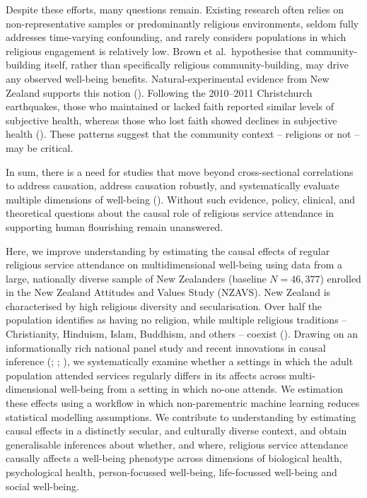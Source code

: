 \documentclass[
  single column]{article}
\begin{document}
Despite these efforts, many questions remain. Existing research often
relies on non-representative samples or predominantly religious
environments, seldom fully addresses time-varying confounding, and
rarely considers populations in which religious engagement is relatively
low. Brown et al.~hypothesise that community-building itself, rather
than specifically religious community-building, may drive any observed
well-being benefits. Natural-experimental evidence from New Zealand
supports this notion (). Following the 2010--2011 Christchurch earthquakes, those
who maintained or lacked faith reported similar levels of subjective
health, whereas those who lost faith showed declines in subjective
health (). These
patterns suggest that the community context -- religious or not -- may
be critical.

In sum, there is a need for studies that move beyond cross-sectional
correlations to address causation, address causation robustly, and
systematically evaluate multiple dimensions of well-being
().
Without such evidence, policy, clinical, and theoretical questions about
the causal role of religious service attendance in supporting human
flourishing remain unanswered.

Here, we improve understanding by estimating the causal effects of
regular religious service attendance on multidimensional well-being
using data from a large, nationally diverse sample of New Zealanders
(baseline \(N=46,377\)) enrolled in the New Zealand Attitudes and Values
Study (NZAVS). New Zealand is characterised by high religious diversity
and secularisation. Over half the population identifies as having no
religion, while multiple religious traditions -- Christianity, Hinduism,
Islam, Buddhism, and others -- coexist
(). Drawing
on an informationally rich national panel study and recent innovations
in causal inference (;
;
), we systematically
examine whether a settings in which the adult population attended
services regularly differs in its affects across multi-dimensional
well-being from a setting in which no-one attends. We estimation these
effects using a workflow in which non-parementric machine learning
reduces statistical modelling assumptions. We contribute to
understanding by estimating causal effects in a distinctly secular, and
culturally diverse context, and obtain generalisable inferences about
whether, and where, religious service attendance causally affects a
well-being phenotype across dimensions of biological health,
psychological health, person-focussed well-being, life-focussed
well-being and social well-being.
\end{document}
